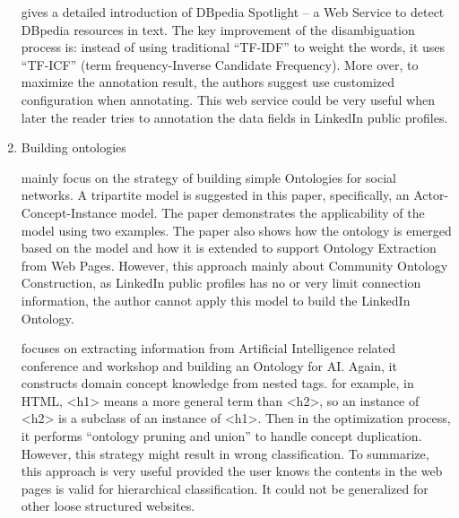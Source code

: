 \begin{enumerate}
\cite{mendes2011} gives a detailed introduction of DBpedia Spotlight -- a Web Service to detect DBpedia resources in text. The key improvement of the disambiguation process is: instead of using traditional ``TF-IDF'' to weight the words, it uses ``TF-ICF'' (term frequency-Inverse Candidate Frequency). More over, to maximize the annotation result, the authors suggest use customized configuration when annotating. This web service could be very useful when later the reader tries to annotation the data fields in LinkedIn public profiles.

\item
Building ontologies

\cite{mika2007} mainly focus on the strategy of building simple Ontologies for social networks. A tripartite model is suggested in this paper, specifically, an Actor-Concept-Instance model. The paper demonstrates the applicability of the model using two examples. The paper also shows how the ontology is emerged based on the model and how it is extended to support Ontology Extraction from Web Pages. However, this approach mainly about Community Ontology Construction, as LinkedIn public profiles has no or very limit connection information, the author cannot apply this model to build the LinkedIn Ontology.

\cite{wang2011} focuses on extracting information from Artificial Intelligence related conference and workshop and building an Ontology for AI. Again, it constructs domain concept knowledge from nested tags. for example, in HTML, <h1> means a more general term than <h2>, so an instance of <h2> is a subclass of an instance of <h1>. Then in the optimization process, it performs ``ontology pruning and union'' to handle concept duplication. However, this strategy might result in wrong classification. To summarize, this approach is very useful provided the user knows the contents in the web pages is valid for hierarchical classification. It could not be generalized for other loose structured websites.

\end{enumerate}

